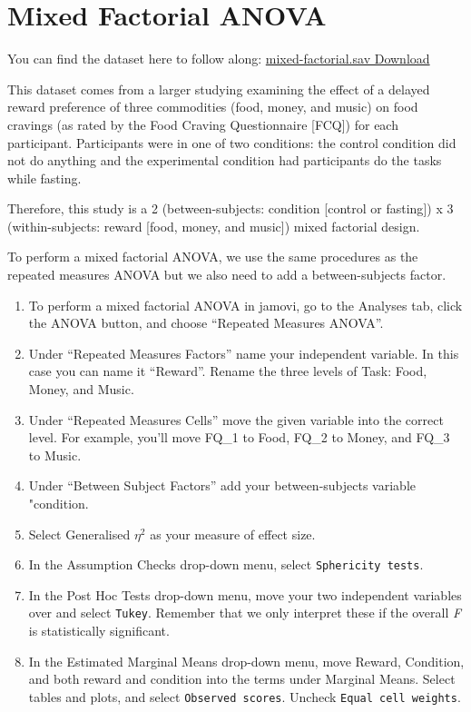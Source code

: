 \documentclass[
]{book}
\begin{document}
\hypertarget{mixed-factorial-anova}{%
\section{Mixed Factorial ANOVA}\label{mixed-factorial-anova}}

You can find the dataset here to follow along: \href{https://github.com/danawanzer/stats-with-jamovi/blob/master/data/mixed-factorial.sav}{mixed-factorial.sav Download}

This dataset comes from a larger studying examining the effect of a delayed reward preference of three commodities (food, money, and music) on food cravings (as rated by the Food Craving Questionnaire {[}FCQ{]}) for each participant. Participants were in one of two conditions: the control condition did not do anything and the experimental condition had participants do the tasks while fasting.

Therefore, this study is a 2 (between-subjects: condition {[}control or fasting{]}) x 3 (within-subjects: reward {[}food, money, and music{]}) mixed factorial design.

To perform a mixed factorial ANOVA, we use the same procedures as the repeated measures ANOVA but we also need to add a between-subjects factor.

\begin{enumerate}
\def\labelenumi{\arabic{enumi}.}
\item
  To perform a mixed factorial ANOVA in jamovi, go to the Analyses tab, click the ANOVA button, and choose ``Repeated Measures ANOVA''.
\item
  Under ``Repeated Measures Factors'' name your independent variable. In this case you can name it ``Reward''. Rename the three levels of Task: Food, Money, and Music.
\item
  Under ``Repeated Measures Cells'' move the given variable into the correct level. For example, you'll move FQ\_1 to Food, FQ\_2 to Money, and FQ\_3 to Music.
\item
  Under ``Between Subject Factors'' add your between-subjects variable "condition.
\item
  Select Generalised \(\eta^2\) as your measure of effect size.
\item
  In the Assumption Checks drop-down menu, select \texttt{Sphericity\ tests}.
\item
  In the Post Hoc Tests drop-down menu, move your two independent variables over and select \texttt{Tukey}. Remember that we only interpret these if the overall \emph{F} is statistically significant.
\item
  In the Estimated Marginal Means drop-down menu, move Reward, Condition, and both reward and condition into the terms under Marginal Means. Select tables and plots, and select \texttt{Observed\ scores}. Uncheck \texttt{Equal\ cell\ weights}.
\end{enumerate}
\end{document}
